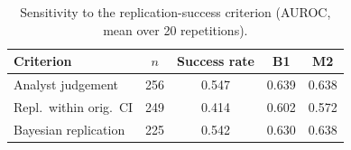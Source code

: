 \begin{table}[t]\centering\caption{Sensitivity to the replication-success criterion (AUROC, mean over 20 repetitions).}\label{tab:sens}
\scriptsize\begin{tabular}{@{}lcccc@{}}\toprule
Criterion & $n$ & Success rate & B1 & M2 \\\midrule
Analyst judgement & 256 & 0.547 & 0.639 & 0.638 \\
Repl.\ within orig.\ CI & 249 & 0.414 & 0.602 & 0.572 \\
Bayesian replication & 225 & 0.542 & 0.630 & 0.638 \\
\bottomrule\end{tabular}\end{table}
